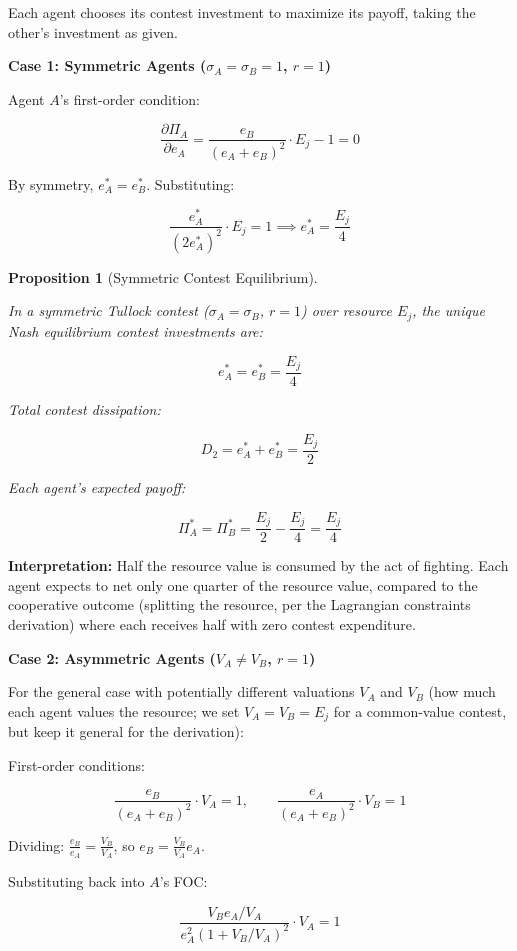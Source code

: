 \documentclass[11pt]{article}
\theoremstyle{plain}
\newtheorem{proposition}[theorem]{Proposition}
\theoremstyle{definition}
\theoremstyle{remark}
\begin{document}
Each agent chooses its contest investment to maximize its payoff, taking
the other's investment as given.

\textbf{Case 1: Symmetric Agents (\(\sigma_A = \sigma_B = 1\),
\(r = 1\))}

Agent \(A\)'s first-order condition:

\[\frac{\partial \Pi_A}{\partial e_A} = \frac{e_B}{(e_A + e_B)^2} \cdot E_j - 1 = 0\]

By symmetry, \(e_A^* = e_B^*\). Substituting:

\[\frac{e_A^*}{(2 e_A^*)^2} \cdot E_j = 1 \implies e_A^* = \frac{E_j}{4}\]

\begin{proposition}[Symmetric Contest Equilibrium]
\label{prop-symmetric-contest}

In a symmetric Tullock contest ($\sigma_A = \sigma_B$, $r = 1$) over resource $E_j$, the unique Nash equilibrium contest investments are:

$$e_A^* = e_B^* = \frac{E_j}{4}$$

Total contest dissipation:

$$D_2 = e_A^* + e_B^* = \frac{E_j}{2}$$

Each agent's expected payoff:

$$\Pi_A^* = \Pi_B^* = \frac{E_j}{2} - \frac{E_j}{4} = \frac{E_j}{4}$$
\end{proposition}

\textbf{Interpretation:} Half the resource value is consumed by the act
of fighting. Each agent expects to net only one quarter of the resource
value, compared to the cooperative outcome (splitting the resource, per
the Lagrangian constraints derivation) where each receives half with
zero contest expenditure.

\textbf{Case 2: Asymmetric Agents (\(V_A \neq V_B\), \(r = 1\))}

For the general case with potentially different valuations \(V_A\) and
\(V_B\) (how much each agent values the resource; we set
\(V_A = V_B = E_j\) for a common-value contest, but keep it general for
the derivation):

First-order conditions:

\[\frac{e_B}{(e_A + e_B)^2} \cdot V_A = 1, \qquad \frac{e_A}{(e_A + e_B)^2} \cdot V_B = 1\]

Dividing: \(\frac{e_B}{e_A} = \frac{V_B}{V_A}\), so
\(e_B = \frac{V_B}{V_A} e_A\).

Substituting back into \(A\)'s FOC:

\[\frac{V_B e_A / V_A}{e_A^2 (1 + V_B/V_A)^2} \cdot V_A = 1\]
\end{document}
